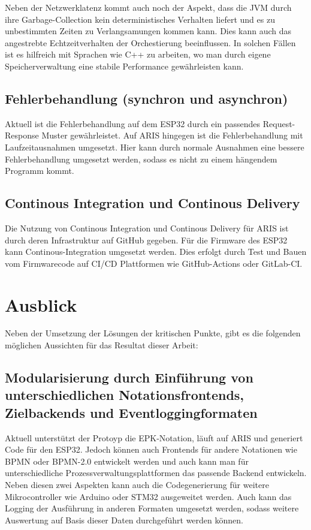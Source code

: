 Neben der Netzwerklatenz kommt auch noch der Aspekt, dass die JVM durch ihre Garbage-Collection kein deterministisches Verhalten liefert und 
es zu unbestimmten Zeiten zu Verlangsamungen kommen kann. \cite{carpen-amarie_performance_2015} \cite{al-jaroodi_object-reuse_2005} Dies kann auch das angestrebte Echtzeitverhalten der Orchestierung beeinflussen. In solchen
Fällen ist es hilfreich mit Sprachen wie C++ zu arbeiten, wo man durch eigene Speicherverwaltung eine stabile Performance gewährleisten kann. \cite{stroustrup_brief_2015} \cite{herter_timing-predictable_2014}

\subsection{Fehlerbehandlung (synchron und asynchron)}

Aktuell ist die Fehlerbehandlung auf dem ESP32 durch ein passendes Request-Response Muster gewährleistet. Auf ARIS hingegen ist die Fehlerbehandlung mit
Laufzeitausnahmen umgesetzt. Hier kann durch normale Ausnahmen eine bessere Fehlerbehandlung umgesetzt werden, sodass es nicht zu einem hängendem Programm kommt.

\subsection{Continous Integration und Continous Delivery}

Die Nutzung von Continous Integration und Continous Delivery für ARIS ist durch deren Infrastruktur auf GitHub gegeben. Für die Firmware des ESP32 kann Continous-Integration 
umgesetzt werden. Dies erfolgt durch Test und Bauen vom Firmwarecode auf CI/CD Plattformen wie GitHub-Actions oder GitLab-CI.

\section{Ausblick}

Neben der Umsetzung der Lösungen der kritischen Punkte, gibt es die folgenden möglichen Aussichten für das Resultat dieser Arbeit:

\subsection{Modularisierung durch Einführung von unterschiedlichen Notationsfrontends, Zielbackends und Eventloggingformaten}

Aktuell unterstützt der Protoyp die EPK-Notation, läuft auf ARIS und generiert Code für den ESP32. Jedoch können auch Frontends für andere Notationen 
wie BPMN oder BPMN-2.0 entwickelt werden und auch kann man für unterschiedliche Prozessverwaltungsplattformen das passende Backend entwickeln.
Neben diesen zwei Aspekten kann auch die Codegenerierung für weitere Mikrocontroller wie Arduino oder STM32 ausgeweitet werden. Auch kann das Logging der 
Ausführung in anderen Formaten umgesetzt werden, sodass weitere Auswertung auf Basis dieser Daten durchgeführt werden können.

